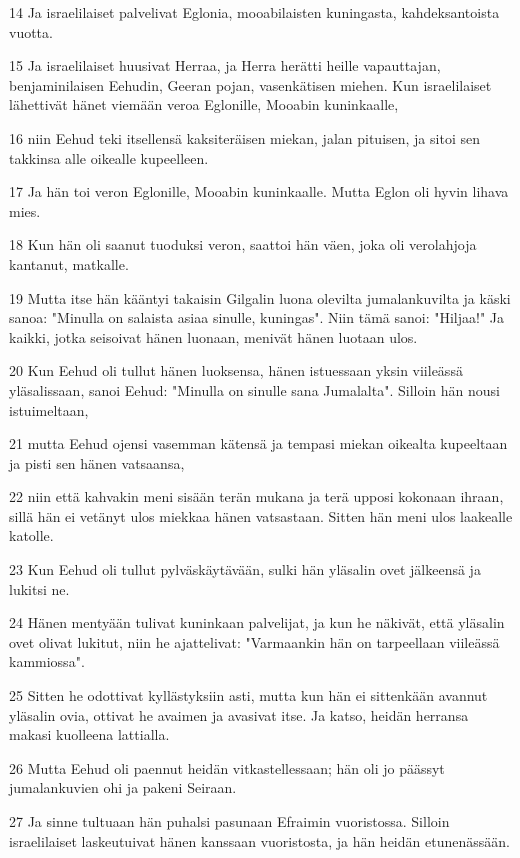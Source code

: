 \par 14 Ja israelilaiset palvelivat Eglonia, mooabilaisten kuningasta, kahdeksantoista vuotta.
\par 15 Ja israelilaiset huusivat Herraa, ja Herra herätti heille vapauttajan, benjaminilaisen Eehudin, Geeran pojan, vasenkätisen miehen. Kun israelilaiset lähettivät hänet viemään veroa Eglonille, Mooabin kuninkaalle,
\par 16 niin Eehud teki itsellensä kaksiteräisen miekan, jalan pituisen, ja sitoi sen takkinsa alle oikealle kupeelleen.
\par 17 Ja hän toi veron Eglonille, Mooabin kuninkaalle. Mutta Eglon oli hyvin lihava mies.
\par 18 Kun hän oli saanut tuoduksi veron, saattoi hän väen, joka oli verolahjoja kantanut, matkalle.
\par 19 Mutta itse hän kääntyi takaisin Gilgalin luona olevilta jumalankuvilta ja käski sanoa: "Minulla on salaista asiaa sinulle, kuningas". Niin tämä sanoi: "Hiljaa!" Ja kaikki, jotka seisoivat hänen luonaan, menivät hänen luotaan ulos.
\par 20 Kun Eehud oli tullut hänen luoksensa, hänen istuessaan yksin viileässä yläsalissaan, sanoi Eehud: "Minulla on sinulle sana Jumalalta". Silloin hän nousi istuimeltaan,
\par 21 mutta Eehud ojensi vasemman kätensä ja tempasi miekan oikealta kupeeltaan ja pisti sen hänen vatsaansa,
\par 22 niin että kahvakin meni sisään terän mukana ja terä upposi kokonaan ihraan, sillä hän ei vetänyt ulos miekkaa hänen vatsastaan. Sitten hän meni ulos laakealle katolle.
\par 23 Kun Eehud oli tullut pylväskäytävään, sulki hän yläsalin ovet jälkeensä ja lukitsi ne.
\par 24 Hänen mentyään tulivat kuninkaan palvelijat, ja kun he näkivät, että yläsalin ovet olivat lukitut, niin he ajattelivat: "Varmaankin hän on tarpeellaan viileässä kammiossa".
\par 25 Sitten he odottivat kyllästyksiin asti, mutta kun hän ei sittenkään avannut yläsalin ovia, ottivat he avaimen ja avasivat itse. Ja katso, heidän herransa makasi kuolleena lattialla.
\par 26 Mutta Eehud oli paennut heidän vitkastellessaan; hän oli jo päässyt jumalankuvien ohi ja pakeni Seiraan.
\par 27 Ja sinne tultuaan hän puhalsi pasunaan Efraimin vuoristossa. Silloin israelilaiset laskeutuivat hänen kanssaan vuoristosta, ja hän heidän etunenässään.
